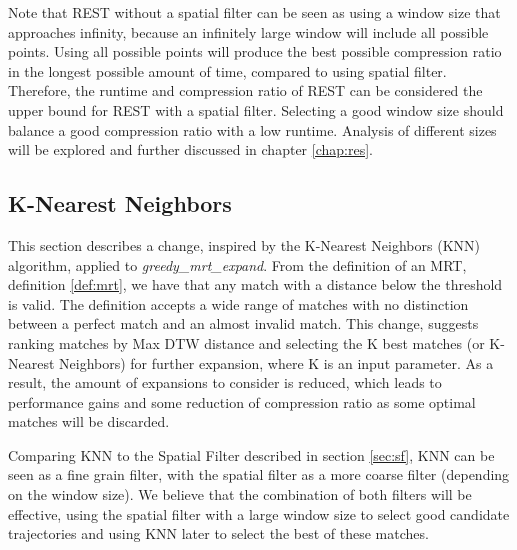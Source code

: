 Note that REST without a spatial filter can be seen as using a window size that approaches infinity, because an infinitely large window will include all possible points. Using all possible points will produce the best possible compression ratio in the longest possible amount of time, compared to using spatial filter. Therefore, the runtime and compression ratio of REST can be considered the upper bound for REST with a spatial filter. Selecting a good window size should balance a good compression ratio with a low runtime. Analysis of different sizes will be explored and further discussed in chapter \ref{chap:res}.



\subsection{K-Nearest Neighbors}
This section describes a change, inspired by the K-Nearest Neighbors (KNN) algorithm, applied to \textit{greedy\_mrt\_expand}. From the definition of an MRT, definition \ref{def:mrt}, we have that any match with a distance below the threshold is valid. The definition accepts a wide range of matches with no distinction between a perfect match and an almost invalid match. This change, suggests ranking matches by Max DTW distance and selecting the K best matches (or K-Nearest Neighbors) for further expansion, where K is an input parameter. As a result, the amount of expansions to consider is reduced, which leads to performance gains and some reduction of compression ratio as some optimal matches will be discarded.

Comparing KNN to the Spatial Filter described in section \ref{sec:sf}, KNN can be seen as a fine grain filter, with the spatial filter as a more coarse filter (depending on the window size). We believe that the combination of both filters will be effective, using the spatial filter with a large window size to select good candidate trajectories and using KNN later to select the best of these matches.


